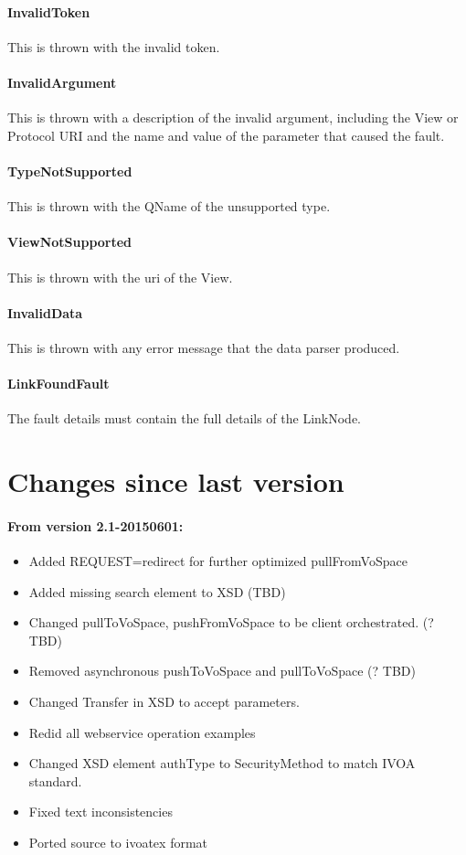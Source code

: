 \documentclass[11pt,a4paper]{ivoa}
\begin{document}
\paragraph{InvalidToken}
This is thrown with the invalid token.

\paragraph{InvalidArgument}
This is thrown with a description of the invalid argument, including the View or Protocol URI and the name and value of the parameter that caused the fault.

\paragraph{TypeNotSupported}
This is thrown with the QName of the unsupported type.

\paragraph{ViewNotSupported}
This is thrown with the uri of the View.

\paragraph{InvalidData}
This is thrown with any error message that the data parser produced.

\paragraph{LinkFoundFault}
The fault details must contain the full details of the LinkNode.

\section{Changes since last version}
\label{sec:changes since last version}

\paragraph{From version 2.1-20150601:}
\begin{itemize}
    \item Added REQUEST=redirect for further optimized pullFromVoSpace
    \item Added missing search element to XSD (TBD)
    \item Changed pullToVoSpace, pushFromVoSpace to be client orchestrated. (? TBD)
    \item Removed asynchronous pushToVoSpace and pullToVoSpace (? TBD)
    \item Changed Transfer in XSD to accept parameters.
    \item Redid all webservice operation examples
    \item Changed XSD element authType to SecurityMethod to match IVOA standard.
    \item Fixed text inconsistencies
    \item Ported source to ivoatex format
\end{itemize}
\end{document}
